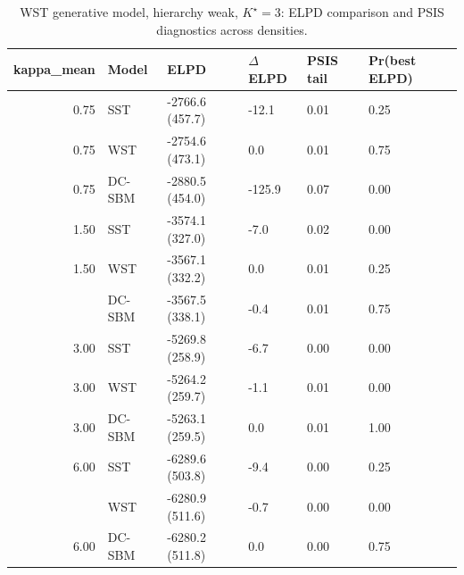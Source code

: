 \begin{table}
\centering
\caption{WST generative model, hierarchy weak, $K^\star=3$: ELPD comparison and PSIS diagnostics across densities.}
\centering
\begin{tabular}[t]{rlllll}
\toprule
kappa_mean & Model & ELPD & $\Delta$ELPD & PSIS tail & Pr(best ELPD)\\
\midrule
0.75 & SST & -2766.6 (457.7) & -12.1 & 0.01 & 0.25\\
0.75 & WST & -2754.6 (473.1) & 0.0 & 0.01 & 0.75\\
0.75 & DC-SBM & -2880.5 (454.0) & -125.9 & 0.07 & 0.00\\
1.50 & SST & -3574.1 (327.0) & -7.0 & 0.02 & 0.00\\
1.50 & WST & -3567.1 (332.2) & 0.0 & 0.01 & 0.25\\
\addlinespace
1.50 & DC-SBM & -3567.5 (338.1) & -0.4 & 0.01 & 0.75\\
3.00 & SST & -5269.8 (258.9) & -6.7 & 0.00 & 0.00\\
3.00 & WST & -5264.2 (259.7) & -1.1 & 0.01 & 0.00\\
3.00 & DC-SBM & -5263.1 (259.5) & 0.0 & 0.01 & 1.00\\
6.00 & SST & -6289.6 (503.8) & -9.4 & 0.00 & 0.25\\
\addlinespace
6.00 & WST & -6280.9 (511.6) & -0.7 & 0.00 & 0.00\\
6.00 & DC-SBM & -6280.2 (511.8) & 0.0 & 0.00 & 0.75\\
\bottomrule
\end{tabular}
\end{table}
